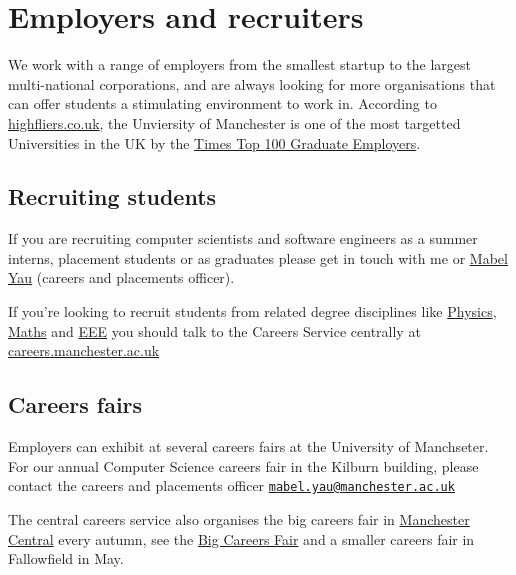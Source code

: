 \documentclass[12pt,]{book}
\begin{document}
\hypertarget{employers-and-recruiters}{%
\chapter{Employers and recruiters}\label{employers-and-recruiters}}

We work with a range of employers from the smallest startup to the largest multi-national corporations, and are always looking for more organisations that can offer students a stimulating environment to work in. According to \href{https://www.highfliers.co.uk}{highfliers.co.uk}, the Unviersity of Manchester is one of the most targetted Universities in the UK by the \href{https://www.top100graduateemployers.com}{Times Top 100 Graduate Employers}.

\hypertarget{recruiting-students}{%
\section{Recruiting students}\label{recruiting-students}}

If you are recruiting computer scientists and software engineers as a summer interns, placement students or as graduates please get in touch with me or \href{https://uk.linkedin.com/in/mabel-yau}{Mabel Yau} (careers and placements officer).

If you're looking to recruit students from related degree disciplines like \href{https://www.physics.manchester.ac.uk/}{Physics}, \href{https://www.maths.manchester.ac.uk/}{Maths} and \href{https://www.eee.manchester.ac.uk/}{EEE} you should talk to the Careers Service centrally at \href{http://www.careers.manchester.ac.uk/}{careers.manchester.ac.uk}

\hypertarget{careers-fairs}{%
\section{Careers fairs}\label{careers-fairs}}

Employers can exhibit at several careers fairs at the University of Manchseter. For our annual Computer Science careers fair in the Kilburn building, please contact the careers and placements officer \href{mailto:mabel.yau@manchester.ac.uk}{\nolinkurl{mabel.yau@manchester.ac.uk}}

The central careers service also organises the big careers fair in \href{https://www.manchestercentral.co.uk/}{Manchester Central} every autumn, see
the \href{http://www.careers.manchester.ac.uk/events/bigcareersfair/}{Big Careers Fair} and a smaller careers fair in Fallowfield in May.
\end{document}
